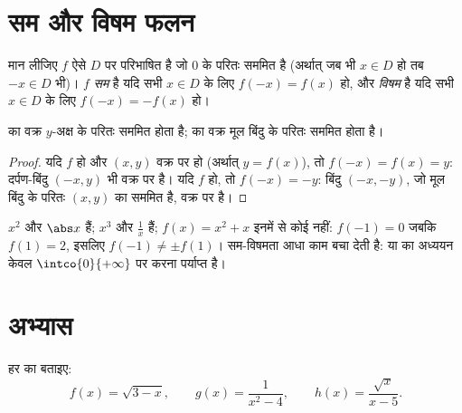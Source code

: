 \section{सम और विषम फलन}

\begin{definition}[सम-विषमता]\label{def:g11:func:parity}
मान लीजिए $f$ ऐसे  $D$ पर परिभाषित है जो $0$ के परितः सममित है
(अर्थात् जब भी $x \in D$ हो तब $-x \in D$ भी)।  $f$ \emph{सम}
है यदि सभी $x \in D$ के लिए $f(-x) = f(x)$ हो, और \emph{विषम} है यदि
सभी $x \in D$ के लिए $f(-x) = -f(x)$ हो।
\end{definition}

\begin{proposition}[ज्यामितीय अर्थ]\label{prop:g11:func:paritysym}
 का वक्र $y$-अक्ष के परितः सममित होता है;  का वक्र मूल
बिंदु के परितः सममित होता है।
\end{proposition}

\begin{proof}
यदि $f$  हो और $(x, y)$ वक्र पर हो (अर्थात् $y = f(x)$), तो $f(-x) = f(x) = y$: दर्पण-बिंदु
$(-x, y)$ भी वक्र पर है। यदि $f$  हो, तो $f(-x) = -y$: बिंदु $(-x, -y)$, जो मूल बिंदु
के परितः $(x,y)$ का सममित है, वक्र पर है।
\end{proof}

\begin{example}
$x^2$ और $\abs x$  हैं; $x^3$ और $\frac1x$  हैं; $f(x) = x^2 + x$ इनमें से कोई नहीं:
$f(-1) = 0$ जबकि $f(1) = 2$, इसलिए $f(-1) \neq \pm f(1)$। सम-विषमता आधा काम बचा देती है:  या  का अध्ययन केवल $\intco{0}{+\infty}$ पर करना पर्याप्त है।
\end{example}

\section{अभ्यास}

\begin{exercise}[$\star$]\label{exo:g11:func:1}
हर  का  बताइए:
\[
f(x) = \sqrt{3 - x}, \qquad
g(x) = \frac{1}{x^2 - 4}, \qquad
h(x) = \frac{\sqrt{x}}{x - 5} .
\]
\end{exercise}

